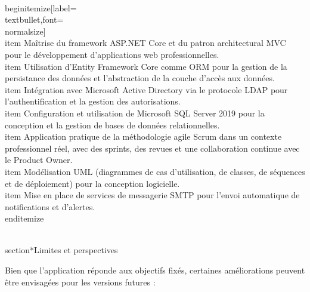 \\begin{itemize}[label=\\textbullet,font=\\normalsize]
    \\item Maîtrise du framework ASP.NET Core et du patron architectural MVC pour le développement d'applications web professionnelles.
    \\item Utilisation d'Entity Framework Core comme ORM pour la gestion de la persistance des données et l'abstraction de la couche d'accès aux données.
    \\item Intégration avec Microsoft Active Directory via le protocole LDAP pour l'authentification et la gestion des autorisations.
    \\item Configuration et utilisation de Microsoft SQL Server 2019 pour la conception et la gestion de bases de données relationnelles.
    \\item Application pratique de la méthodologie agile Scrum dans un contexte professionnel réel, avec des sprints, des revues et une collaboration continue avec le Product Owner.
    \\item Modélisation UML (diagrammes de cas d'utilisation, de classes, de séquences et de déploiement) pour la conception logicielle.
    \\item Mise en place de services de messagerie SMTP pour l'envoi automatique de notifications et d'alertes.
\\end{itemize}

\\section*{Limites et perspectives}

Bien que l'application réponde aux objectifs fixés, certaines améliorations peuvent être envisagées pour les versions futures :

